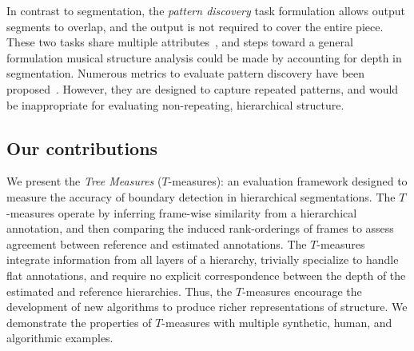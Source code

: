 \documentclass{article}
\begin{document}
In contrast to segmentation, the \emph{pattern discovery} task formulation allows output segments to overlap, 
and the output is not required to cover the entire piece.
These two tasks share multiple attributes~\cite{Nieto2014_Motives}, and steps toward a 
general formulation musical structure analysis could be made by accounting for depth in segmentation.
Numerous metrics to evaluate pattern discovery have been proposed~\cite{Collins2013}.
However, they are designed to capture repeated patterns, and would be inappropriate for 
evaluating non-repeating, hierarchical structure.


\subsection{Our contributions}
We present the \emph{Tree Measures} ($T$-measures): an evaluation framework designed
to measure the accuracy of boundary detection in hierarchical segmentations.
The $T$-measures operate by inferring frame-wise similarity from a hierarchical annotation, and then comparing 
the induced rank-orderings of frames to assess agreement between reference and estimated annotations.
The $T$-measures integrate information from all layers of a hierarchy, trivially
specialize to handle flat annotations, and require no explicit correspondence between the
depth of the estimated and reference hierarchies.
Thus, the $T$-measures encourage the development of new algorithms to produce richer representations of structure.
We demonstrate the properties of $T$-measures with multiple synthetic, human, and algorithmic examples.

\end{document}
